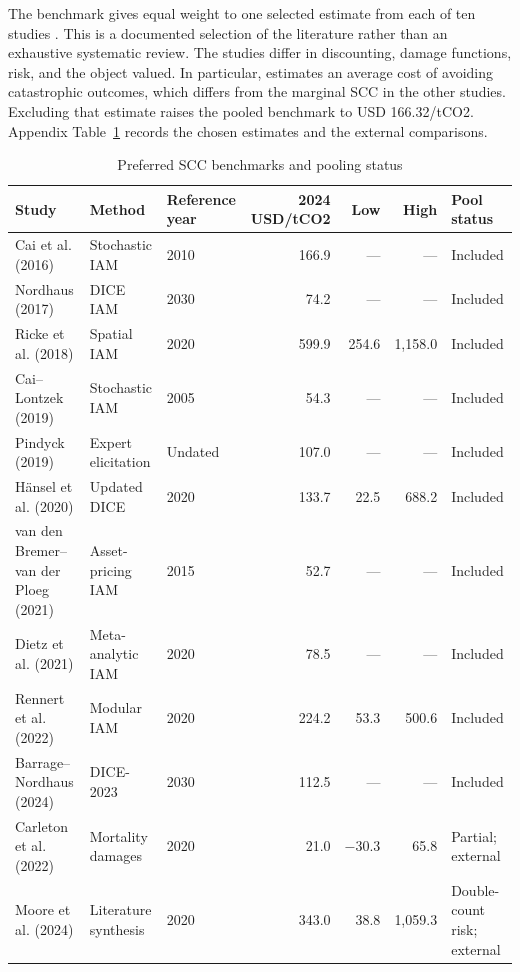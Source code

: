 \documentclass[11pt]{article}
\begin{document}
The benchmark gives equal weight to one selected estimate from each of ten studies \citep{cai2016,nordhaus2017,ricke2018,cailontzek2019,pindyck2019,hansel2020,vandenbremer2021,dietz2021,rennert2022,barrage2024}. This is a documented selection of the literature rather than an exhaustive systematic review. The studies differ in discounting, damage functions, risk, and the object valued. In particular, \citet{pindyck2019} estimates an average cost of avoiding catastrophic outcomes, which differs from the marginal SCC in the other studies. Excluding that estimate raises the pooled benchmark to USD 166.32/tCO2. Appendix Table~\ref{tab:scc} records the chosen estimates and the external comparisons.

\begin{landscape}
\begin{table}[htbp]\centering\caption{Preferred SCC benchmarks and pooling status}\label{tab:scc}
\small
\begin{tabular}{lllrrrl}\toprule
Study & Method & Reference year & 2024 USD/tCO2 & Low & High & Pool status \\\midrule
Cai et al. (2016) & Stochastic IAM & 2010 & 166.9 & --- & --- & Included \\
Nordhaus (2017) & DICE IAM & 2030 & 74.2 & --- & --- & Included \\
Ricke et al. (2018) & Spatial IAM & 2020 & 599.9 & 254.6 & 1,158.0 & Included \\
Cai--Lontzek (2019) & Stochastic IAM & 2005 & 54.3 & --- & --- & Included \\
Pindyck (2019) & Expert elicitation & Undated & 107.0 & --- & --- & Included \\
H\"ansel et al. (2020) & Updated DICE & 2020 & 133.7 & 22.5 & 688.2 & Included \\
van den Bremer--van der Ploeg (2021) & Asset-pricing IAM & 2015 & 52.7 & --- & --- & Included \\
Dietz et al. (2021) & Meta-analytic IAM & 2020 & 78.5 & --- & --- & Included \\
Rennert et al. (2022) & Modular IAM & 2020 & 224.2 & 53.3 & 500.6 & Included \\
Barrage--Nordhaus (2024) & DICE-2023 & 2030 & 112.5 & --- & --- & Included \\
Carleton et al. (2022) & Mortality damages & 2020 & 21.0 & $-30.3$ & 65.8 & Partial; external \\
Moore et al. (2024) & Literature synthesis & 2020 & 343.0 & 38.8 & 1,059.3 & Double-count risk; external \\

\end{tabular}
\end{table}
\end{landscape}
\end{document}
